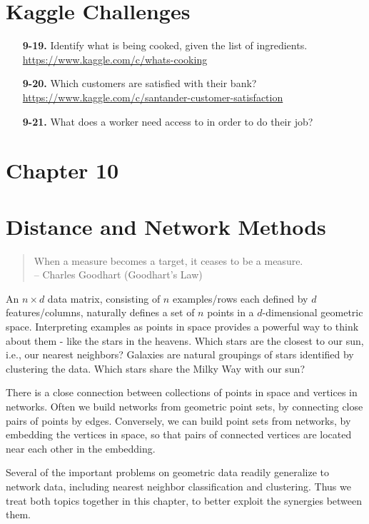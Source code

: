 \documentclass[10pt]{article}
\begin{document}
\section*{Kaggle Challenges}
\begin{enumerate}
    \item [{\bf 9-19.}] Identify what is being cooked, given the list of ingredients. \url{https://www.kaggle.com/c/whats-cooking}
    \item [{\bf 9-20.}] Which customers are satisfied with their bank? \url{https://www.kaggle.com/c/santander-customer-satisfaction}
    \item [{\bf 9-21.}] What does a worker need access to in order to do their job?
\end{enumerate}

\section*{Chapter 10}
\section*{Distance and Network Methods}
\begin{quote}
When a measure becomes a target, it ceases to be a measure.\\
-- Charles Goodhart (Goodhart’s Law)
\end{quote}

An $n \times d$ data matrix, consisting of $n$ examples/rows each defined by $d$ features/columns, naturally defines a set of $n$ points in a $d$-dimensional geometric space. Interpreting examples as points in space provides a powerful way to think about them - like the stars in the heavens. Which stars are the closest to our sun, i.e., our nearest neighbors? Galaxies are natural groupings of stars identified by clustering the data. Which stars share the Milky Way with our sun?

There is a close connection between collections of points in space and vertices in networks. Often we build networks from geometric point sets, by connecting close pairs of points by edges. Conversely, we can build point sets from networks, by embedding the vertices in space, so that pairs of connected vertices are located near each other in the embedding.

Several of the important problems on geometric data readily generalize to network data, including nearest neighbor classification and clustering. Thus we treat both topics together in this chapter, to better exploit the synergies between them.
\end{document}
